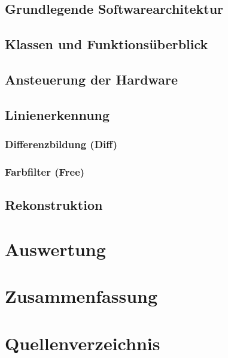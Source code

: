 \documentclass[ngerman,a4paper]{scrartcl}
\begin{document}
\subsection{Grundlegende Softwarearchitektur}

\subsection{Klassen und Funktionsüberblick}

\subsection{Ansteuerung der Hardware}

\subsection{Linienerkennung}

\subsubsection{Differenzbildung (Diff)}

\subsubsection{Farbfilter (Free)}

\subsection{Rekonstruktion}


\section{Auswertung}


\section{Zusammenfassung}


\section{Quellenverzeichnis}

\end{document}
